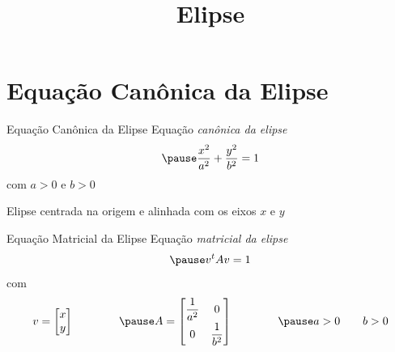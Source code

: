\documentclass[fleqn,aspectratio=169,12pt]{beamer}
\title{Elipse}
\begin{document}
\addtitle

\section{Equação Canônica da Elipse}

\begin{frame}{Equação Canônica da Elipse}
  Equação \emph{canônica da elipse}
  \[
    \pause
    \frac{x^2}{a^2} + \frac{y^2}{b^2} = 1
  \]
  \pause
  com \(a > 0\) e \(b > 0\)

  \pause
  \bigskip
  Elipse centrada na origem e alinhada com os eixos $x$ e $y$
\end{frame}

\begin{frame}{Equação Matricial da Elipse}
  Equação \emph{matricial da elipse}
  \[
    \pause
    v^t A v = 1
  \]
  \pause
  com
  \[
    v = \begin{bmatrix}
      x \\
      y
    \end{bmatrix}
    \qquad\qquad
    \pause
    A = \begin{bmatrix}
      \dfrac{1}{a^2} & 0              \\[2mm]
      0              & \dfrac{1}{b^2}
    \end{bmatrix}
    \qquad\qquad
    \pause
    a > 0
    \qquad
    b > 0
  \]
\end{frame}
\end{document}

